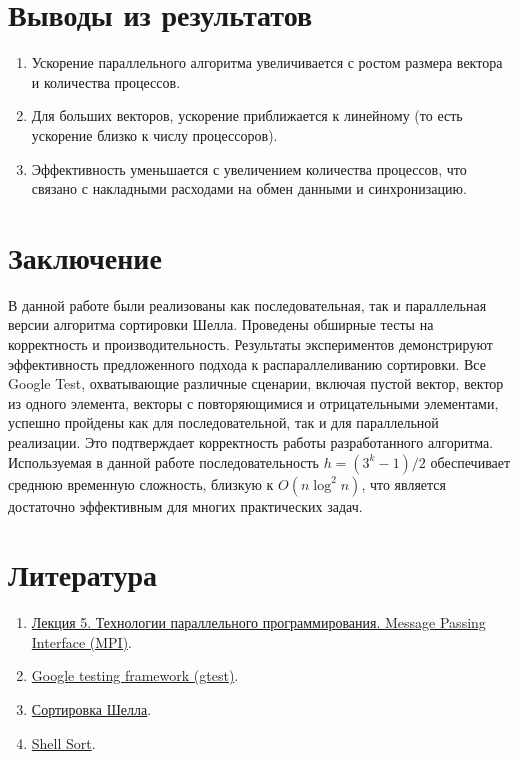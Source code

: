 \documentclass[12pt]{article}
\begin{document}
\section{Выводы из результатов}
\begin{enumerate}
     unit-тесты прошли успешно, что подтверждает корректность работы как последовательного, так и параллельного алгоритмов.
    \item Ускорение параллельного алгоритма увеличивается с ростом размера вектора и количества процессов.
    \item Для больших векторов, ускорение приближается к линейному (то есть ускорение близко к числу процессоров).
    \item Эффективность уменьшается с увеличением количества процессов, что связано с накладными расходами на обмен данными и синхронизацию.
\end{enumerate}

\section{Заключение}

\hspace*{1.25em}В данной работе были реализованы как последовательная, так и параллельная версии алгоритма сортировки Шелла. Проведены обширные тесты на корректность и производительность. Результаты экспериментов демонстрируют эффективность предложенного подхода к распараллеливанию сортировки. Все Google Test, охватывающие различные сценарии, включая пустой вектор, вектор из одного элемента, векторы с повторяющимися и отрицательными элементами, успешно пройдены как для последовательной, так и для параллельной реализации. Это подтверждает корректность работы разработанного алгоритма. Используемая в данной работе последовательность $h = (3^k - 1) / 2$ обеспечивает среднюю временную сложность, близкую к $O(n \log^2 n)$, что является достаточно эффективным для многих практических задач.

\section*{Литература}

\begin{enumerate}
    \item \href{https://parallel.ru/vvv/mpi.html#p1}{Лекция 5. Технологии параллельного программирования. Message Passing Interface (MPI)}.
    \item \href{https://habr.com/ru/post/119090/}{Google testing framework (gtest)}.
    \item \href{https://ru.wikipedia.org/wiki/Сортировка_Шелла}{Сортировка Шелла}.\
    \item \href{https://www.geeksforgeeks.org/shell-sort/}{Shell Sort}.
    
\end{enumerate}
\end{document}

